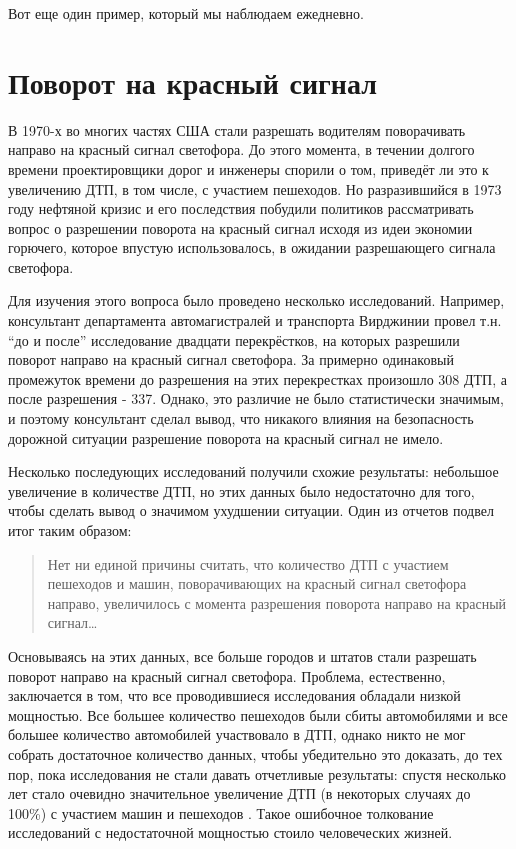 Вот еще один пример, который мы наблюдаем ежедневно.

\section{Поворот на красный сигнал}
\label{chp3:wrongturnred}

В 1970-х во многих частях США стали разрешать водителям поворачивать направо на красный сигнал светофора. До этого момента, в течении долгого времени проектировщики дорог и инженеры спорили о том, приведёт ли это к увеличению ДТП, в том числе, с участием пешеходов. Но разразившийся в 1973 году нефтяной кризис и его последствия побудили политиков рассматривать вопрос о разрешении поворота на красный сигнал исходя из идеи экономии горючего, которое впустую использовалось, в ожидании разрешающего сигнала светофора. 

Для изучения этого вопроса было проведено несколько исследований. Например, консультант департамента автомагистралей и транспорта Вирджинии провел т.н. ``до и после'' исследование двадцати перекрёстков, на которых разрешили поворот направо на красный сигнал светофора. За примерно одинаковый промежуток времени до разрешения на этих перекрестках произошло 308 ДТП, а после разрешения - 337. Однако, это различие не было статистически значимым, и поэтому консультант сделал вывод, что никакого влияния на безопасность дорожной ситуации разрешение поворота на красный сигнал не имело.

Несколько последующих исследований получили схожие результаты: небольшое увеличение в количестве ДТП, но этих данных было недостаточно для того, чтобы сделать вывод о значимом ухудшении ситуации. Один из отчетов подвел итог таким образом: 

\begin{quotation}
Нет ни единой причины считать, что количество ДТП с участием пешеходов и машин, поворачивающих на красный сигнал светофора направо, увеличилось с момента разрешения поворота направо на красный сигнал\dots
\end{quotation}

Основываясь на этих данных, все больше городов и штатов стали разрешать поворот направо на красный сигнал светофора. Проблема, естественно, заключается в том, что все проводившиеся исследования обладали низкой мощностью. Все большее количество пешеходов были сбиты автомобилями и все большее количество автомобилей участвовало в ДТП, однако никто не мог собрать достаточное количество данных, чтобы убедительно это доказать, до тех пор, пока исследования не стали давать отчетливые результаты: спустя несколько лет стало очевидно значительное увеличение ДТП (в некоторых случаях до 100\%) с участием машин и пешеходов \cite{hauer_harm_2004,preusser_effect_1982}. Такое ошибочное толкование исследований с недостаточной мощностью стоило человеческих жизней.  
